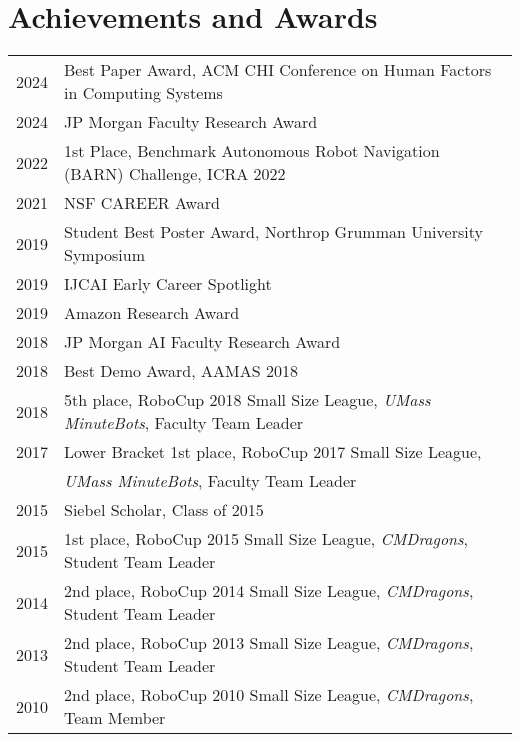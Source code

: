 \documentclass[Times]{article}
\begin{document}
\section*{Achievements and Awards}
\begin{tabular}{ p{1.2cm} l }
  2024  & Best Paper Award, ACM CHI Conference on Human Factors in Computing Systems  \\
  2024  & JP Morgan Faculty Research Award \\
  2022  & 1st Place, Benchmark Autonomous Robot Navigation (BARN) Challenge,
          ICRA 2022 \\
  2021  & NSF CAREER Award\\
  2019  & Student Best Poster Award, Northrop Grumman University Symposium \\
  2019  & IJCAI Early Career Spotlight \\
  2019  & Amazon Research Award \\
  2018  & JP Morgan AI Faculty Research Award \\
  2018  & Best Demo Award, AAMAS 2018 \\
  2018  & 5th place, RoboCup 2018 Small Size League,
      \emph{UMass MinuteBots}, Faculty Team Leader\\
  2017  & Lower Bracket 1st place, RoboCup 2017 Small Size League, \\
      &\emph{UMass MinuteBots}, Faculty Team Leader\\
  2015  & Siebel Scholar, Class of 2015 \\
  2015  & 1st place, RoboCup 2015 Small Size League,
     \emph{CMDragons}, Student Team Leader\\
  2014  & 2nd place, RoboCup 2014 Small Size League,
     \emph{CMDragons}, Student Team Leader\\
  2013  & 2nd place, RoboCup 2013 Small Size League,
     \emph{CMDragons}, Student Team Leader\\
  2010  & 2nd place, RoboCup 2010 Small Size League,
     \emph{CMDragons}, Team Member\\
\end{tabular}


\end{document}

